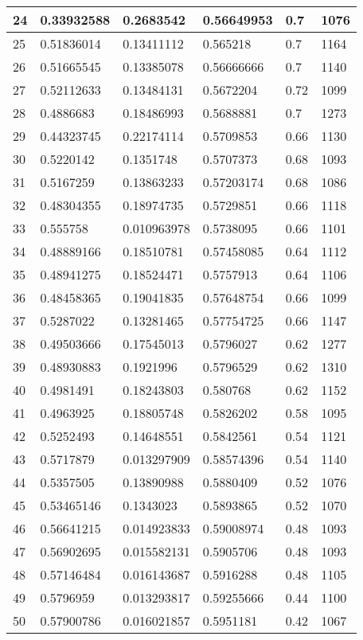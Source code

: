 \begin{longtable}{|l|l|l|l|l|l|}
24 & 0.33932588 & 0.2683542 & 0.56649953 & 0.7 & 1076 \\ \hline 
25 & 0.51836014 & 0.13411112 & 0.565218 & 0.7 & 1164 \\ \hline 
26 & 0.51665545 & 0.13385078 & 0.56666666 & 0.7 & 1140 \\ \hline 
27 & 0.52112633 & 0.13484131 & 0.5672204 & 0.72 & 1099 \\ \hline 
28 & 0.4886683 & 0.18486993 & 0.5688881 & 0.7 & 1273 \\ \hline 
29 & 0.44323745 & 0.22174114 & 0.5709853 & 0.66 & 1130 \\ \hline 
30 & 0.5220142 & 0.1351748 & 0.5707373 & 0.68 & 1093 \\ \hline 
31 & 0.5167259 & 0.13863233 & 0.57203174 & 0.68 & 1086 \\ \hline 
32 & 0.48304355 & 0.18974735 & 0.5729851 & 0.66 & 1118 \\ \hline 
33 & 0.555758 & 0.010963978 & 0.5738095 & 0.66 & 1101 \\ \hline 
34 & 0.48889166 & 0.18510781 & 0.57458085 & 0.64 & 1112 \\ \hline 
35 & 0.48941275 & 0.18524471 & 0.5757913 & 0.64 & 1106 \\ \hline 
36 & 0.48458365 & 0.19041835 & 0.57648754 & 0.66 & 1099 \\ \hline 
37 & 0.5287022 & 0.13281465 & 0.57754725 & 0.66 & 1147 \\ \hline 
38 & 0.49503666 & 0.17545013 & 0.5796027 & 0.62 & 1277 \\ \hline 
39 & 0.48930883 & 0.1921996 & 0.5796529 & 0.62 & 1310 \\ \hline 
40 & 0.4981491 & 0.18243803 & 0.580768 & 0.62 & 1152 \\ \hline 
41 & 0.4963925 & 0.18805748 & 0.5826202 & 0.58 & 1095 \\ \hline 
42 & 0.5252493 & 0.14648551 & 0.5842561 & 0.54 & 1121 \\ \hline 
43 & 0.5717879 & 0.013297909 & 0.58574396 & 0.54 & 1140 \\ \hline 
44 & 0.5357505 & 0.13890988 & 0.5880409 & 0.52 & 1076 \\ \hline 
45 & 0.53465146 & 0.1343023 & 0.5893865 & 0.52 & 1070 \\ \hline 
46 & 0.56641215 & 0.014923833 & 0.59008974 & 0.48 & 1093 \\ \hline 
47 & 0.56902695 & 0.015582131 & 0.5905706 & 0.48 & 1093 \\ \hline 
48 & 0.57146484 & 0.016143687 & 0.5916288 & 0.48 & 1105 \\ \hline 
49 & 0.5796959 & 0.013293817 & 0.59255666 & 0.44 & 1100 \\ \hline 
50 & 0.57900786 & 0.016021857 & 0.5951181 & 0.42 & 1067 \\ \hline 
\end{longtable}